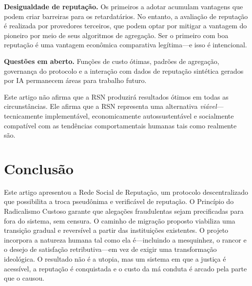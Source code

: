 \documentclass[11pt,a4paper,twocolumn]{article}
\begin{document}
\textbf{Desigualdade de reputação.} Os primeiros a adotar acumulam vantagens que podem criar barreiras para os retardatários. No entanto, a avaliação de reputação é realizada por provedores terceiros, que podem optar por mitigar a vantagem do pioneiro por meio de seus algoritmos de agregação. Ser o primeiro com boa reputação é uma vantagem econômica comparativa legítima---e isso é intencional.

\textbf{Questões em aberto.} Funções de custo ótimas, padrões de agregação, governança do protocolo e a interação com dados de reputação sintética gerados por IA permanecem áreas para trabalho futuro.

Este artigo não afirma que a RSN produzirá resultados ótimos em todas as circunstâncias. Ele afirma que a RSN representa uma alternativa \emph{viável}---tecnicamente implementável, economicamente autossustentável e socialmente compatível com as tendências comportamentais humanas tais como realmente são.

\section{Conclusão}

Este artigo apresentou a Rede Social de Reputação, um protocolo descentralizado que possibilita a troca pseudônima e verificável de reputação. O Princípio do Radicalismo Custoso garante que alegações fraudulentas sejam precificadas para fora do sistema, sem censura. O caminho de migração proposto viabiliza uma transição gradual e reversível a partir das instituições existentes. O projeto incorpora a natureza humana tal como ela é---incluindo a mesquinhez, o rancor e o desejo de satisfação retributiva---em vez de exigir uma transformação ideológica. O resultado não é a utopia, mas um sistema em que a justiça é acessível, a reputação é conquistada e o custo da má conduta é arcado pela parte que o causou.


\end{document}
